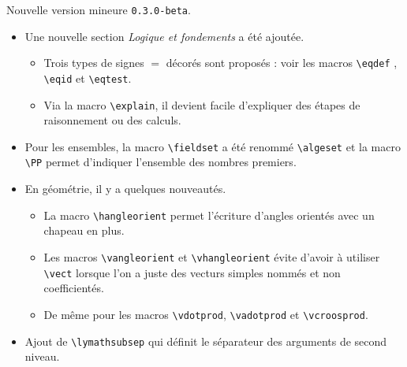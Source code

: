 Nouvelle version mineure \verb+0.3.0-beta+.

\begin{itemize}[itemsep=.5em]
    \item Une nouvelle section \emph{\og Logique et fondements \fg} a été ajoutée.
    \begin{itemize}[itemsep=.5em]
        \item Trois types de signes $=$ décorés sont proposés : voir les macros \verb+\eqdef+ , \verb+\eqid+ et \verb+\eqtest+.

        \item Via la macro \verb+\explain+, il devient facile d'expliquer des étapes de raisonnement ou des calculs.
    \end{itemize}


    \item Pour les ensembles, la macro \verb+\fieldset+ a été renommé \verb+\algeset+ et la macro \verb+\PP+ permet d'indiquer l'ensemble des nombres premiers.


    \item En géométrie, il y a quelques nouveautés.
    \begin{itemize}[itemsep=.5em]
        \item La macro \verb+\hangleorient+ permet l'écriture d'angles orientés avec un chapeau en plus.

        \item Les macros \verb+\vangleorient+ et \verb+\vhangleorient+ évite d'avoir à utiliser \verb+\vect+ lorsque l'on a juste des vecturs simples nommés et non coefficientés.

        \item De même pour les macros \verb+\vdotprod+, \verb+\vadotprod+ et \verb+\vcroosprod+.
    \end{itemize}


    \item Ajout de \verb+\lymathsubsep+ qui définit le séparateur des arguments de second niveau.
\end{itemize}

